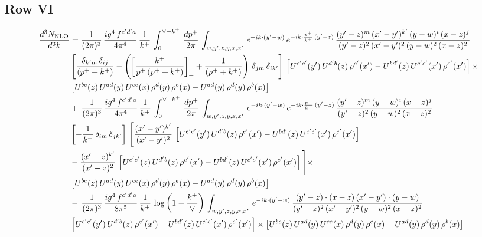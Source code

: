 \documentclass[9pt]{article}
\numberwithin{equation}{section}
\begin{document}
\subsection{Row VI}
\begin{align}
    \frac{d^{3}N_{\rm NLO}}{d^{3}k} & =  \frac{1}{(2\pi)^{3}}\, \frac{ig^{4}\,f^{c'd'a}}{4\pi^{4}}\, \frac{1}{k^{+}}\,\int_{0}^{\vee-k^{+}}\, \frac{dp^{+}}{2\pi}\, \int_{w,y',z,y,x,x'}\, e^{-ik\cdot (y'-w)}\, e^{-ik\cdot \frac{p^{+}}{k^{+}}\,(y'-z)}\,\frac{(y'-z)^{m}\,(x'-y')^{k'}\,(y-w)^{i}\,(x-z)^{j}}{(y'-z)^{2}\,(x'-y')^{2}\,(y-w)^{2}\,(x-z)^{2}}\notag \\ & \left[\frac{\delta_{k'm}\,\delta_{ij}}{(p^{+}+k^{+})}-\left(\left[\frac{k^{+}}{p^{+}\,(p^{+}+k^{+})}\right]_{+}+\frac{1}{(p^{+}+k^{+})}\right)\,\delta_{jm}\,\delta_{ik'}\right]\, \left[U^{e'c'}(y')\,U^{d'b}(z)\,\rho^{e'}(x')-U^{bd'}(z)\,U^{c'e'}(x')\,\rho^{e'}(x')\right]\times\notag \\ &  \left[U^{bc}(z)\,U^{ad}(y)\,U^{ce}(x)\,\rho^{d}(y)\,\rho^{e}(x)-U^{ad}(y)\,\rho^{d}(y)\,\rho^{b}(x)\right] \notag \\ &  +\,\frac{1}{(2\pi)^{3}}\, \frac{ig^{4}\,f^{c'd'a}}{4\pi^{4}}\, \frac{1}{k^{+}}\,\int_{0}^{\vee-k^{+}}\, \frac{dp^{+}}{2\pi}\, \int_{w,y',z,y,x,x'}\, e^{-ik\cdot (y'-w)}\, e^{-ik\cdot \frac{p^{+}}{k^{+}}\,(y'-z)}\,\frac{(y'-z)^{m}\,(y-w)^{i}\,(x-z)^{j}}{(y'-z)^{2}\,(y-w)^{2}\,(x-z)^{2}}\notag \\ &  \left[-\frac{1}{k^{+}}\, \delta_{im}\, \delta_{jk'}\right]\, \Bigg[\frac{(x'-y')^{k'}}{(x'-y')^{2}}\,\left[U^{e'c'}(y')\,U^{d'b}(z)\,\rho^{e'}(x')-U^{bd'}(z)\,U^{c'e'}(x')\,\rho^{e'}(x')\right]\notag \\ & -\frac{(x'-z)^{k'}}{(x'-z)^{2}}\,\left[U^{e'c'}(z)\,U^{d'b}(z)\,\rho^{e'}(x')-U^{bd'}(z)\,U^{c'e'}(x')\,\rho^{e'}(x')\right]\Bigg]\times\notag \\ &    \left[U^{bc}(z)\,U^{ad}(y)\,U^{ce}(x)\,\rho^{d}(y)\,\rho^{e}(x)-U^{ad}(y)\,\rho^{d}(y)\,\rho^{b}(x)\right] \notag \\
&  -\,\frac{1}{(2\pi)^{3}}\, \frac{ig^{4}\,f^{c'd'a}}{8\pi^{5}}\, \frac{1}{k^{+}}\,\log{\left(1-\frac{k^{+}}{\vee}\right)}\, \int_{w,y',z,y,x,x'}\, e^{-ik\cdot (y'-w)}\,\frac{(y'-z)\cdot (x-z)\,(x'-y')\cdot (y-w)}{(y'-z)^{2}\,(x'-y')^{2}\,(y-w)^{2}\,(x-z)^{2}}\notag \\ & \left[U^{e'c'}(y')\,U^{d'b}(z)\,\rho^{e'}(x')-U^{bd'}(z)\,U^{c'e'}(x')\,\rho^{e'}(x')\right]\times  \left[U^{bc}(z)\,U^{ad}(y)\,U^{ce}(x)\,\rho^{d}(y)\,\rho^{e}(x)-U^{ad}(y)\,\rho^{d}(y)\,\rho^{b}(x)\right]
\end{align}
\end{document}
